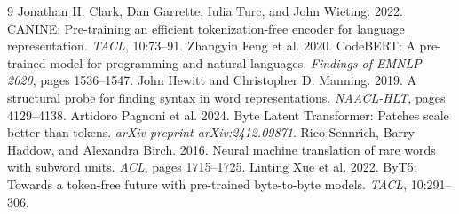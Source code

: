 \begin{thebibliography}{9}
\footnotesize\setlength{\itemsep}{1pt}\setlength{\parskip}{0pt}
 Jonathan H. Clark, Dan Garrette, Iulia Turc,
and John Wieting. 2022. CANINE: Pre-training an efficient tokenization-free encoder for
language representation. \emph{TACL}, 10:73--91.
 Zhangyin Feng et al. 2020. CodeBERT: A
pre-trained model for programming and natural languages. \emph{Findings of EMNLP 2020}, pages
1536--1547.
 John Hewitt and Christopher D.
Manning. 2019. A structural probe for finding syntax in word representations.
\emph{NAACL-HLT}, pages 4129--4138.
 Artidoro Pagnoni et al. 2024. Byte Latent
Transformer: Patches scale better than tokens. \emph{arXiv preprint arXiv:2412.09871}.
 Rico Sennrich, Barry Haddow, and Alexandra
Birch. 2016. Neural machine translation of rare words with subword units. \emph{ACL}, pages
1715--1725.
 Linting Xue et al. 2022. ByT5: Towards a token-free
future with pre-trained byte-to-byte models. \emph{TACL}, 10:291--306.
\end{thebibliography}


